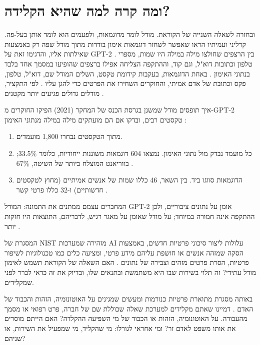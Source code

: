 \section{ומה קרה למה שהיא הקלידה?}
ובחזרה לשאלה השנייה של הקוראת. מודל לומד מדוגמאות, ולפעמים הוא לומד אותן בעל-פה. קרליני ועמיתיו הראו שאפשר לשחזר דוגמאות אימון בודדות מתוך מודל שפה רק באמצעות שאילתות אליו, והדגימו זאת על GPT-2 \cite{S-ch06-06}. בין הרצפים שחולצו מילה במילה היו שמות, מספרי טלפון וכתובות דוא"ל, וגם קוד, וההתקפה הצליחה אפילו ברצפים שהופיעו במסמך אחד בלבד בנתוני האימון \cite{S-ch06-08}. באחת הדוגמאות, בעקבות קידומת טקסט, השלים המודל שם, דוא"ל, טלפון, פקס וכתובת של אדם אמיתי, והחוקרים השחירו את הפרטים כדי להגן עליו \cite{S-ch06-08}. לפי התקציר, מודלים גדולים פגיעים יותר מקטנים \cite{S-ch06-06}.
\begin{behindbox}{איך תופסים מודל שמשנן}
בגרסת הכנס של המחקר (2021) הפיקו החוקרים מ-GPT-2 טקסטים רבים, ובדקו אם הם מועתקים מילה במילה מנתוני האימון \cite{S-ch06-08}:
\begin{enumerate}
\item מתוך הטקסטים נבחרו 1,800 מועמדים.
\item כל מועמד נבדק מול נתוני האימון. נמצאו 604 דוגמאות משוננות ייחודיות, כלומר 33.5\%; בווריאנט המוצלח ביותר של השיטה, 67\% \cite{S-ch06-08}.
\item הדוגמאות סווגו ביד. בין השאר, 46 כללו שמות של אנשים אמיתיים (מחוץ לטקסטים חדשותיים) ו-32 כללו פרטי קשר \cite{S-ch06-08}.
\end{enumerate}
המחברים עצמם ממתנים את התמונה: המודל GPT-2 אומן על נתונים ציבוריים, ולכן ההתקפה אינה חמורה במיוחד; על מודל שאומן על מאגר רגיש, לדבריהם, התוצאות היו חזקות יותר \cite{S-ch06-08}.
\end{behindbox}
המסגרת של NIST מזהירה שמערכות AI עלולות ליצור סיכוני פרטיות חדשים, באמצעות הסקה שמזהה אנשים או חושפת עליהם מידע פרטי, ומציעה כלים כמו טכנולוגיות לשיפור פרטיות, הסרת פרטים מזהים וצבירה של נתונים \cite{S-ch06-10}. האם השאלה של הקוראת תשמש לאימון מודל עתידי? זה תלוי בשירות שבו היא משתמשת ובתנאים שלו, ובדיוק את זה כדאי לברר לפני שמקלידים.
\begin{thinkbox}
באותה מסגרת מתוארת פרטיות כנורמות ומעשים שמגינים על האוטונומיה, הזהות והכבוד של האדם \cite{S-ch06-10}.
דמיינו שאתם מקלידים למערכת שאלה שכוללת שם של חברה, פרט רפואי או מסמך מהעבודה. על האוטונומיה, הזהות או הכבוד של מי השפיעה ההקלדה? האם הייתם מוסרים את אותו משפט לאדם זר? ומי אחראי לגורלו: מי שהקליד, מי שמפעיל את השירות, או שניהם?
\end{thinkbox}
